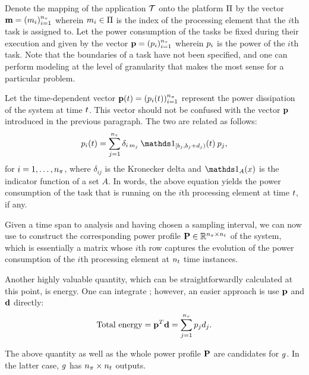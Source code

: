 Denote the mapping of the application $\mathcal{T}$ onto the platform $\Pi$ by the
vector $\mathbf{m} = (m_i)_{i = 1}^{{n_\tau}}$ wherein $m_i \in \Pi$ is the index of
the processing element that the $i$th task is assigned to. Let the power
consumption of the tasks be fixed during their execution and given by the vector
$\mathbf{p} = (p_i)_{i = 1}^{{n_\tau}}$ wherein $p_i$ is the power of the $i$th task. Note
that the boundaries of a task have not been specified, and one can perform
modeling at the level of granularity that makes the most sense for a particular
problem.

Let the time-dependent vector $\mathbf{p}(t) = (p_i(t))_{i = 1}^{{n_\pi}}$ represent the
power dissipation of the system at time $t$. This vector should not be confused
with the vector $\mathbf{p}$ introduced in the previous paragraph. The two are related
as follows:
\begin{equation} \elab{power}
  \p_i(\t) = \sum_{j = 1}^{\nt} \delta_{i\,m_j} \: \one_{[\b_j, \b_j +
    \d_j)}(\t) \: \p_j,
\end{equation}
for $i = 1, \dots, {n_\pi}$, where $\delta_{ij}$ is the Kronecker delta and
$\one_A(x)$ is the indicator function of a set $A$. In words, the above equation
yields the power consumption of the task that is running on the $i$th processing
element at time $t$, if any.

Given a time span to analysis and having chosen a sampling interval, we can now
use  to construct the corresponding power profile $\mathbf{P} \in
\mathbb{R}^{{n_\pi} \times {n_t}}$ of the system, which is essentially a matrix whose $i$th
row captures the evolution of the power consumption of the $i$th processing
element at ${n_t}$ time instances.

Another highly valuable quantity, which can be straightforwardly calculated at
this point, is energy. One can integrate ; however, an easier
approach is use $\mathbf{p}$ and $\mathbf{d}$ directly:
\[
  \text{Total energy} = \mathbf{p}^T \mathbf{d} = \sum_{j = 1}^{n_\tau} p_j d_j.
\]

The above quantity as well as the whole power profile $\mathbf{P}$ are candidates for
$g$. In the latter case, $g$ has ${n_\pi} \times {n_t}$ outputs.
